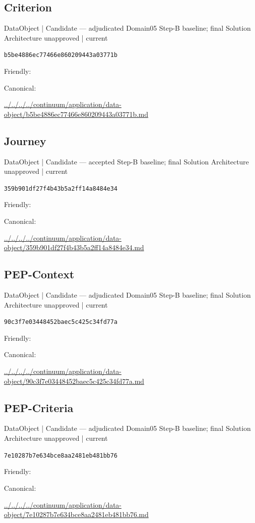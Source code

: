 \documentclass[10pt,a4paper]{article}
\begin{document}
\subsection*{Criterion}
{\small DataObject | Candidate — adjudicated Domain05 Step-B baseline; final Solution Architecture unapproved | current}\par
\texttt{b5be4886ec77466e860209443a03771b}\par
Friendly: \par
Canonical: \par
{\footnotesize\url{../../../../continuum/application/data-object/b5be4886ec77466e860209443a03771b.md}}\par
\subsection*{Journey}
{\small DataObject | Candidate — accepted Step-B baseline; final Solution Architecture unapproved | current}\par
\texttt{359b901df27f4b43b5a2ff14a8484e34}\par
Friendly: \par
Canonical: \par
{\footnotesize\url{../../../../continuum/application/data-object/359b901df27f4b43b5a2ff14a8484e34.md}}\par
\subsection*{PEP-Context}
{\small DataObject | Candidate — adjudicated Domain05 Step-B baseline; final Solution Architecture unapproved | current}\par
\texttt{90c3f7e03448452baec5c425c34fd77a}\par
Friendly: \par
Canonical: \par
{\footnotesize\url{../../../../continuum/application/data-object/90c3f7e03448452baec5c425c34fd77a.md}}\par
\subsection*{PEP-Criteria}
{\small DataObject | Candidate — adjudicated Domain05 Step-B baseline; final Solution Architecture unapproved | current}\par
\texttt{7e10287b7e634bce8aa2481eb481bb76}\par
Friendly: \par
Canonical: \par
{\footnotesize\url{../../../../continuum/application/data-object/7e10287b7e634bce8aa2481eb481bb76.md}}\par
\end{document}
